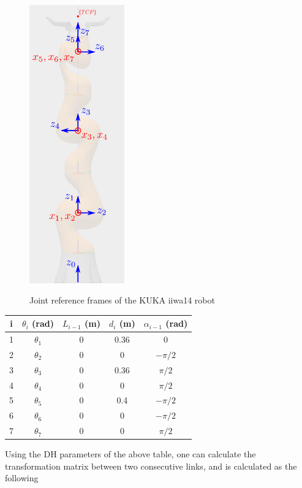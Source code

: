 \begin{center}
\begin{figure}[H]
\centering
\includegraphics[height=12cm]{images/iiwa-frames.png}\\
\caption{Joint reference frames of the KUKA iiwa14 robot}
\end{figure}
\end{center}

\begin{center}
\begin{tabular}{ |c|c|c|c|c| } 
\hline
i & $θ_i$ (rad) & $L_{i-1}$ (m) & $d_i$ (m) & $α_{i-1}$ (rad) \\
\hline
1 & $θ_1$ & 0 & 0.36 & 0 \\
2 & $θ_2$ & 0 & 0 & $-π/2$ \\
3 & $θ_3$ & 0 & 0.36 & $π/2$ \\
4 & $θ_4$ & 0 & 0 & $π/2$\\
5 & $θ_5$ & 0 & 0.4 & $-π/2$ \\
6 & $θ_6$ & 0 & 0 & $-π/2$ \\
7 & $θ_7$ & 0 & 0 & $π/2$ \\
\hline
\end{tabular}
\end{center}

Using the DH parameters of the above table, one can calculate the transformation matrix between two consecutive links, and is calculated as the following

